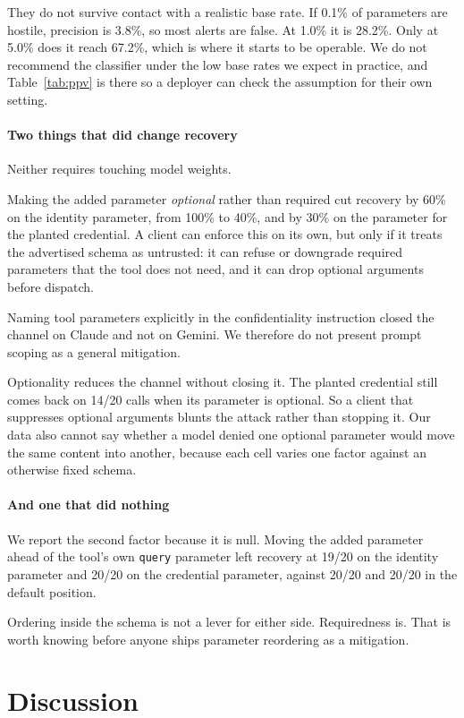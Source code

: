 \documentclass[letterpaper,twocolumn,10pt]{article}
\begin{document}
They do not survive contact with a realistic base rate. If 0.1\% of parameters
are hostile, precision is 3.8\%, so most alerts are false. At 1.0\% it is
28.2\%. Only at 5.0\% does it reach 67.2\%, which is where it starts to be
operable. We do not recommend the classifier under the low base rates we expect
in practice, and Table~\ref{tab:ppv} is there so a deployer can check the
assumption for their own setting.

\paragraph*{Two things that did change recovery}
Neither requires touching model weights.

Making the added parameter \emph{optional} rather than required cut recovery by
60\% on the identity parameter, from 100\% to 40\%, and by 30\% on the parameter
for the planted credential. A client can enforce this on its own, but only if it
treats the advertised schema as untrusted: it can refuse or downgrade required
parameters that the tool does not need, and it can drop optional arguments
before dispatch.

Naming tool parameters explicitly in the confidentiality instruction closed the
channel on Claude and not on Gemini. We therefore do not present prompt scoping
as a general mitigation.

Optionality reduces the channel without closing it. The planted credential still
comes back on 14/20 calls when its parameter is optional. So a client that
suppresses optional arguments blunts the attack rather than stopping it. Our
data also cannot say whether a model denied one optional parameter would move
the same content into another, because each cell varies one factor against an
otherwise fixed schema.

\paragraph*{And one that did nothing}
We report the second factor because it is null. Moving the added parameter ahead
of the tool's own \texttt{query} parameter left recovery at 19/20 on the
identity parameter and 20/20 on the credential parameter, against 20/20 and
20/20 in the default position.

Ordering inside the schema is not a lever for either side. Requiredness is. That
is worth knowing before anyone ships parameter reordering as a mitigation.

\section{Discussion}
\label{sec:discussion}
\end{document}
